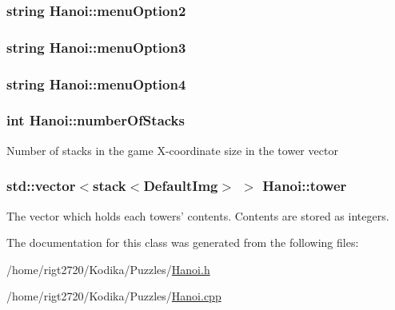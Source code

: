 \hypertarget{classHanoi_ac9345e1760d1367ee05ecdf2e15d3d69}{
\subsubsection[{menu\-Option2}]{\setlength{\rightskip}{0pt plus 5cm}string Hanoi\-::menu\-Option2\hspace{0.3cm}{\ttfamily [private]}}}\label{classHanoi_ac9345e1760d1367ee05ecdf2e15d3d69}
\hypertarget{classHanoi_a94c22f2842c5473df08839fc9d4e860f}{
\subsubsection[{menu\-Option3}]{\setlength{\rightskip}{0pt plus 5cm}string Hanoi\-::menu\-Option3\hspace{0.3cm}{\ttfamily [private]}}}\label{classHanoi_a94c22f2842c5473df08839fc9d4e860f}
\hypertarget{classHanoi_a3c6ac9ab6b2941ab955a2bc2c58cf93a}{
\subsubsection[{menu\-Option4}]{\setlength{\rightskip}{0pt plus 5cm}string Hanoi\-::menu\-Option4\hspace{0.3cm}{\ttfamily [private]}}}\label{classHanoi_a3c6ac9ab6b2941ab955a2bc2c58cf93a}
\hypertarget{classHanoi_abcdaa5a4b56f9c3916bf49e054e1cf8c}{
\subsubsection[{number\-Of\-Stacks}]{\setlength{\rightskip}{0pt plus 5cm}int Hanoi\-::number\-Of\-Stacks\hspace{0.3cm}{\ttfamily [private]}}}\label{classHanoi_abcdaa5a4b56f9c3916bf49e054e1cf8c}
Number of stacks in the game X-\/coordinate size in the tower vector \hypertarget{classHanoi_afe67c656c8ce8c7006e8b7f23fbe9ae9}{
\subsubsection[{tower}]{\setlength{\rightskip}{0pt plus 5cm}std\-::vector$<$stack$<${\bf Default\-Img}$>$ $>$ Hanoi\-::tower\hspace{0.3cm}{\ttfamily [private]}}}\label{classHanoi_afe67c656c8ce8c7006e8b7f23fbe9ae9}
The vector which holds each towers' contents. Contents are stored as integers. 

The documentation for this class was generated from the following files\-:\begin{DoxyCompactItemize}
\item 
/home/rigt2720/\-Kodika/\-Puzzles/\hyperlink{Hanoi_8h}{Hanoi.\-h}\item 
/home/rigt2720/\-Kodika/\-Puzzles/\hyperlink{Hanoi_8cpp}{Hanoi.\-cpp}\end{DoxyCompactItemize}
